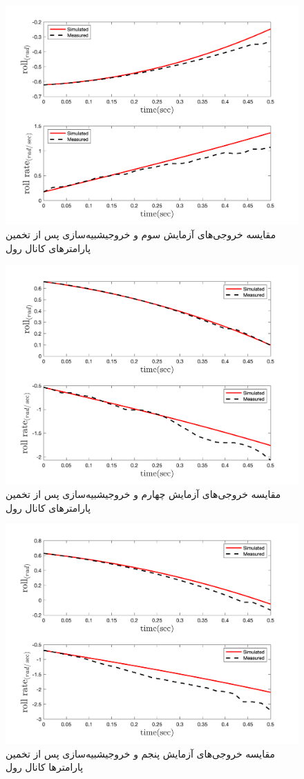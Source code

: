\begin{figure}[H]
	\includegraphics[width=12cm]{../../Figures/RCP/roll_parameter_estimation/RCP_roll_S3.png}
	\centering
	\caption{مقايسه خروجی‌های آزمايش سوم و خروجیشبیه‌سازی پس از تخمین پارامترهای کانال رول}
	\label{roll_ps3}
\end{figure}
\begin{figure}[H]
	\includegraphics[width=12cm]{../../Figures/RCP/roll_parameter_estimation/RCP_roll_S4.png}
	\centering
	\caption{مقايسه خروجی‌های آزمايش چهارم و خروجیشبیه‌سازی پس از تخمین پارامترهای کانال رول}
	\label{roll_ps4}
\end{figure}
\begin{figure}[H]
	\includegraphics[width=12cm]{../../Figures/RCP/roll_parameter_estimation/RCP_roll_S5.png}
	\centering
	\caption{مقايسه خروجی‌های آزمايش پنجم و خروجیشبیه‌سازی پس از تخمین پارامترها کانال رول}
	\label{roll_ps5}
\end{figure}